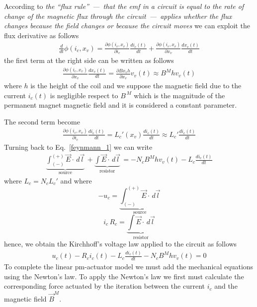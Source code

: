 \documentclass[12pt,a4paper,oneside]{book}
\begin{document}
\begin{onehalfspace}
According to \cite{p6} \textit{the “flux rule”~—~that the emf in a circuit is equal to the rate of change of the magnetic flux through the circuit~—~applies whether the flux changes because the field changes or because the circuit moves} we can exploit the flux derivative as follows
\begin{equation}\label{feynmann_4}
	\begin{aligned}
		\frac{d}{dt}\phi(i_c,x_v)= \frac{\partial\phi(i_c,x_v)}{\partial i_c}\frac{d i_c(t)}{d t} + \frac{\partial\phi(i_c,x_v)}{\partial x_v}\frac{d x_v(t)}{d t}
	\end{aligned}
\end{equation}
the first term at the right side can be written as follows 
\begin{equation}\label{feynmann_5}
	\begin{aligned}
		\frac{\partial\phi(i_c,x_v)}{\partial x_v}\frac{d x_v(t)}{d t} = \frac{\partial {B}x_v h}{\partial x_v} v_v(t) \approx B^Mhv_v(t)
	\end{aligned}
\end{equation}
where $h$ is the height of the coil and we suppose the magnetic field due to the current $i_c(t)$ is negligible respect to ${B}^{\,M}$ which is the magnitude of the permanent magnet magnetic field and it is considered a constant parameter. 

The second term become 
\begin{equation}\label{feynmann_6}
	\begin{aligned}
		\frac{\partial\phi(i_c,x_v)}{\partial i_c}\frac{d i_c(t)}{d t} =L_c'(x_v) \frac{di_c(t)}{dt} \approx L_c'\frac{di_c(t)}{dt}
	\end{aligned}
\end{equation}
Turning back to Eq.~\eqref{feynmann_1}  we can write
\begin{equation}\label{}
	\begin{aligned}
		\underbrace{\int_{(-)}^{(+)}\vec{E}\cdot\,d\vec{l}}_{\text{source}} \, + \underbrace{\int\vec{E}\cdot\,d\vec{l}}_{\text{resistor}}\, = - N_cB^Mhv_v(t) - L_c\frac{di_c(t)}{dt}
	\end{aligned}
\end{equation} 
where $L_c = N_cL_c'$ and where
\begin{equation}\label{}
	-u_c = \underbrace{\int_{(-)}^{(+)}\vec{E}\cdot\, d\vec{l}}_{\text{source}}
\end{equation} 
\begin{equation}\label{}
	i_c\,R_c = \underbrace{\int\vec{E}\cdot\,d\vec{l}}_{\text{resistor}}
\end{equation} 
hence, we obtain the Kirchhoff's voltage law applied to the circuit as follows
\begin{equation}\label{linact_7}
	\begin{aligned}
		u_c(t) - R_ci_c(t)-L_c\frac{di_c(t)}{dt}-N_cB^Mhv_v(t)=0
	\end{aligned}
\end{equation}
To complete the linear pm-actuator model we must add the mechanical equations using the Newton's law. To apply the Newton's law we first must calculate the corresponding force actuated by the iteration between the current $i_c$ and the magnetic field $\vec{B}^M$.



\end{onehalfspace}
\end{document}
